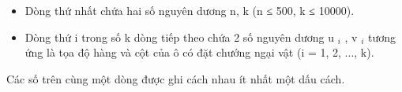 \begin{itemize}
	\item Dòng thứ nhất chứa hai số nguyên dương n, k (n ≤ 500, k ≤ 10000).
	\item Dòng thứ i trong số k dòng tiếp theo chứa 2 số nguyên dương u $_ i $ , v $_ i $ tương ứng là tọa độ hàng và cột của ô có đặt chướng ngại vật (i = 1, 2, ..., k).
\end{itemize}

Các số trên cùng một dòng được ghi cách nhau ít nhất một dấu cách.